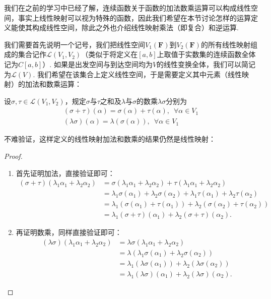 我们在之前的学习中已经了解，连续函数关于函数的加法数乘运算可以构成线性空间，事实上线性映射可以视为特殊的函数，因此我们希望在本节讨论怎样的运算定义能使其构成线性空间，除此之外也介绍线性映射乘法（即复合）和逆运算.

我们需要首先说明一个记号，我们把线性空间$V_1(\mathbf{F})$到$V_2(\mathbf{F})$的所有线性映射组成的集合记作$\mathcal{L}(V_1,V_2)$（类似于将定义在$[a,b]$上取值于实数集的连续函数全体记为$C[a,b]$）. 如果是出发空间与到达空间均为$V$的线性变换全体，我们可以简记为$\mathcal{L}(V)$. 我们希望在该集合上定义线性空间，于是需要定义其中元素（线性映射）的加法和数乘运算：
\begin{definition}{}{}
    设$\sigma,\tau\in \mathcal{L}(V_1,V_2)$，规定$\sigma$与$\tau$之和及$\lambda$与$\sigma$的数乘$\lambda\sigma$分别为
    \begin{gather*}
        (\sigma+\tau)(\alpha)=\sigma(\alpha)+\tau(\alpha),\enspace\forall\alpha\in V_1 \\
        (\lambda\sigma)(\alpha)=\lambda(\sigma(\alpha)),\enspace\forall\alpha\in V_1
    \end{gather*}
\end{definition}

不难验证，这样定义的线性映射加法和数乘的结果仍然是线性映射：
\begin{proof}
\begin{enumerate}
    \item 首先证明加法，直接验证即可：
    \begin{align*}
        (\sigma + \tau)(\lambda_1 \alpha_1 + \lambda_2 \alpha_2) & = \sigma(\lambda_1 \alpha_1 + \lambda_2 \alpha_2) + \tau(\lambda_1 \alpha_1 + \lambda_2 \alpha_2) \\
        & = \lambda_1 \sigma(\alpha_1) + \lambda_2 \sigma(\alpha_2) + \lambda_1 \tau(\alpha_1) + \lambda_2 \tau(\alpha_2) \\
        & = \lambda_1 (\sigma(\alpha_1) + \tau(\alpha_1)) + \lambda_2 (\sigma(\alpha_2) + \tau(\alpha_2)) \\
        &= \lambda_1 (\sigma+\tau)(\alpha_1) + \lambda_2 (\sigma+\tau)(\alpha_2).
    \end{align*}

    \item 再证明数乘，同样直接验证即可：
    \begin{align*}
        (\lambda \sigma)(\lambda_1 \alpha_1 + \lambda_2 \alpha_2) & = \lambda \sigma(\lambda_1 \alpha_1 + \lambda_2 \alpha_2) \\
        & = \lambda (\lambda_1 \sigma(\alpha_1) + \lambda_2 \sigma(\alpha_2)) \\
        & = \lambda_1 (\lambda \sigma(\alpha_1)) + \lambda_2 (\lambda \sigma(\alpha_2)) \\
        & = \lambda_1 (\lambda \sigma)(\alpha_1) + \lambda_2 (\lambda \sigma)(\alpha_2).
    \end{align*}
\end{enumerate}
\end{proof}


